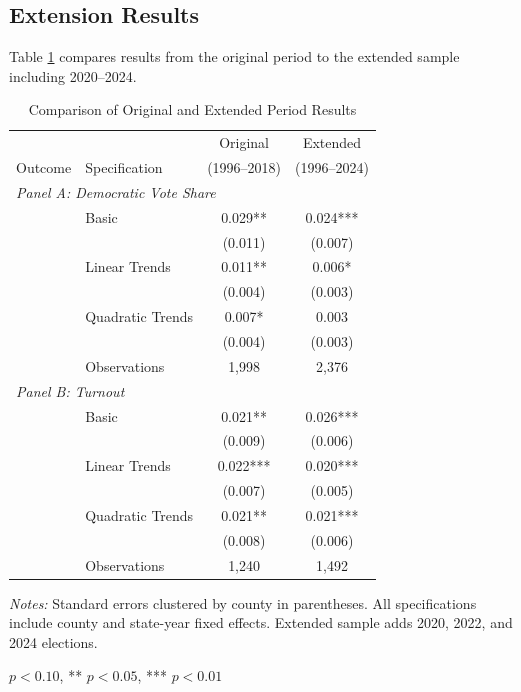 \documentclass[12pt]{article}
\begin{document}
\subsection{Extension Results}

Table \ref{tab:extension} compares results from the original period to the extended sample including 2020--2024.

\begin{table}[H]
\centering
\caption{Comparison of Original and Extended Period Results}
\label{tab:extension}
\begin{threeparttable}
\begin{tabular}{llcc}
\toprule
& & Original & Extended \\
Outcome & Specification & (1996--2018) & (1996--2024) \\
\midrule
\multicolumn{4}{l}{\textit{Panel A: Democratic Vote Share}} \\[0.5em]
& Basic & 0.029** & 0.024*** \\
& & (0.011) & (0.007) \\
& Linear Trends & 0.011** & 0.006* \\
& & (0.004) & (0.003) \\
& Quadratic Trends & 0.007* & 0.003 \\
& & (0.004) & (0.003) \\
& Observations & 1,998 & 2,376 \\[0.5em]
\multicolumn{4}{l}{\textit{Panel B: Turnout}} \\[0.5em]
& Basic & 0.021** & 0.026*** \\
& & (0.009) & (0.006) \\
& Linear Trends & 0.022*** & 0.020*** \\
& & (0.007) & (0.005) \\
& Quadratic Trends & 0.021** & 0.021*** \\
& & (0.008) & (0.006) \\
& Observations & 1,240 & 1,492 \\
\bottomrule
\end{tabular}
\begin{tablenotes}
\small
\item \textit{Notes:} Standard errors clustered by county in parentheses. All specifications include county and state-year fixed effects. Extended sample adds 2020, 2022, and 2024 elections.
\item * $p<0.10$, ** $p<0.05$, *** $p<0.01$
\end{tablenotes}
\end{threeparttable}
\end{table}
\end{document}
